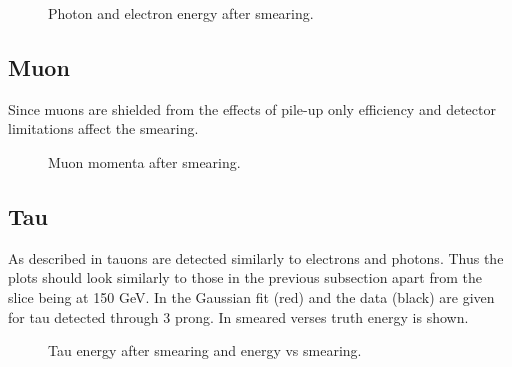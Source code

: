 
 \begin{figure}[H] %
    \hfill
{}
    \hfill
    \hfill
{}
    \caption{Photon and electron energy after smearing.}
    \label{fig:elph}
\end{figure}
\newpage
\subsection{Muon}
Since muons are shielded from the effects of pile-up only efficiency and detector limitations affect the smearing.
 \begin{figure}[H] %
    \hfill
    \caption{Muon momenta after smearing.}
    \label{fig:muon}
  \end{figure}
\subsection{Tau}
As described in  tauons are detected similarly to electrons and photons. Thus the plots should look similarly to those in the previous subsection apart from the slice being at 150 GeV. In  the Gaussian fit (red) and the data (black) are given for tau detected through 3 prong. In  smeared verses truth energy is shown. 
 \begin{figure}[H] %
    \hfill
    \caption{Tau energy after smearing and energy vs smearing.}
    \label{fig:tau}
  \end{figure}
  \newpage
